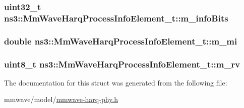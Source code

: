 \subsubsection[{\texorpdfstring{m\+\_\+info\+Bits}{m_infoBits}}]{\setlength{\rightskip}{0pt plus 5cm}uint32\+\_\+t ns3\+::\+Mm\+Wave\+Harq\+Process\+Info\+Element\+\_\+t\+::m\+\_\+info\+Bits}\hypertarget{structns3_1_1MmWaveHarqProcessInfoElement__t_a25cbfe7378cef219db62697112384d84}{}\label{structns3_1_1MmWaveHarqProcessInfoElement__t_a25cbfe7378cef219db62697112384d84}
\subsubsection[{\texorpdfstring{m\+\_\+mi}{m_mi}}]{\setlength{\rightskip}{0pt plus 5cm}double ns3\+::\+Mm\+Wave\+Harq\+Process\+Info\+Element\+\_\+t\+::m\+\_\+mi}\hypertarget{structns3_1_1MmWaveHarqProcessInfoElement__t_affe61e696f0dc96bbdfa2e2255005837}{}\label{structns3_1_1MmWaveHarqProcessInfoElement__t_affe61e696f0dc96bbdfa2e2255005837}
\subsubsection[{\texorpdfstring{m\+\_\+rv}{m_rv}}]{\setlength{\rightskip}{0pt plus 5cm}uint8\+\_\+t ns3\+::\+Mm\+Wave\+Harq\+Process\+Info\+Element\+\_\+t\+::m\+\_\+rv}\hypertarget{structns3_1_1MmWaveHarqProcessInfoElement__t_a86ca6997db34b618a7b3956d17cc8b76}{}\label{structns3_1_1MmWaveHarqProcessInfoElement__t_a86ca6997db34b618a7b3956d17cc8b76}


The documentation for this struct was generated from the following file\+:\begin{DoxyCompactItemize}
\item 
mmwave/model/\hyperlink{mmwave-harq-phy_8h}{mmwave-\/harq-\/phy.\+h}\end{DoxyCompactItemize}
